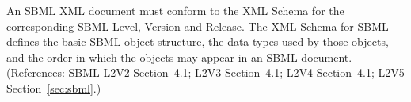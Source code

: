 An SBML XML document must conform to the XML Schema for the corresponding
SBML Level, Version and Release.  The XML Schema for SBML defines the basic
SBML object structure, the data types used by those objects, and the order
in which the objects may appear in an SBML document.  (References: SBML
L2V2 Section~4.1; L2V3 Section~4.1; L2V4 Section~4.1; L2V5 Section~\ref{sec:sbml}.)
